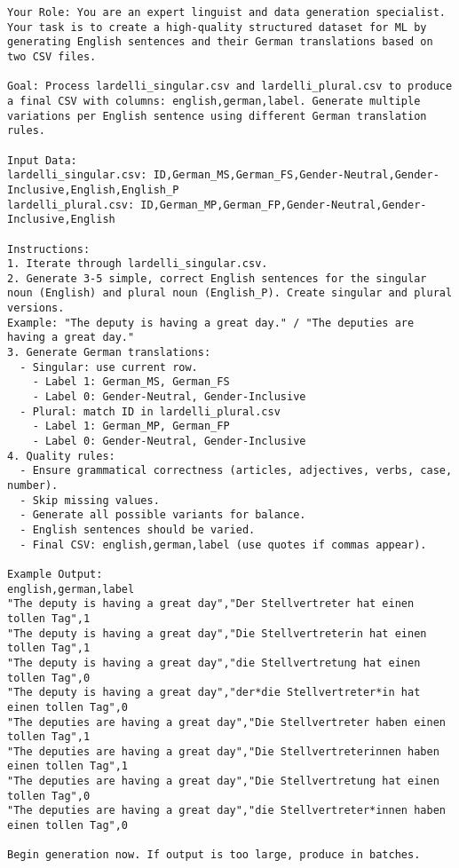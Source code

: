 \begin{lstlisting}
Your Role: You are an expert linguist and data generation specialist. Your task is to create a high-quality structured dataset for ML by generating English sentences and their German translations based on two CSV files.

Goal: Process lardelli_singular.csv and lardelli_plural.csv to produce a final CSV with columns: english,german,label. Generate multiple variations per English sentence using different German translation rules.

Input Data:
lardelli_singular.csv: ID,German_MS,German_FS,Gender-Neutral,Gender-Inclusive,English,English_P
lardelli_plural.csv: ID,German_MP,German_FP,Gender-Neutral,Gender-Inclusive,English

Instructions:
1. Iterate through lardelli_singular.csv.
2. Generate 3-5 simple, correct English sentences for the singular noun (English) and plural noun (English_P). Create singular and plural versions.
Example: "The deputy is having a great day." / "The deputies are having a great day."
3. Generate German translations:
  - Singular: use current row.
    - Label 1: German_MS, German_FS
    - Label 0: Gender-Neutral, Gender-Inclusive
  - Plural: match ID in lardelli_plural.csv
    - Label 1: German_MP, German_FP
    - Label 0: Gender-Neutral, Gender-Inclusive
4. Quality rules:
  - Ensure grammatical correctness (articles, adjectives, verbs, case, number).
  - Skip missing values.
  - Generate all possible variants for balance.
  - English sentences should be varied.
  - Final CSV: english,german,label (use quotes if commas appear).

Example Output:
english,german,label
"The deputy is having a great day","Der Stellvertreter hat einen tollen Tag",1
"The deputy is having a great day","Die Stellvertreterin hat einen tollen Tag",1
"The deputy is having a great day","die Stellvertretung hat einen tollen Tag",0
"The deputy is having a great day","der*die Stellvertreter*in hat einen tollen Tag",0
"The deputies are having a great day","Die Stellvertreter haben einen tollen Tag",1
"The deputies are having a great day","Die Stellvertreterinnen haben einen tollen Tag",1
"The deputies are having a great day","Die Stellvertretung hat einen tollen Tag",0
"The deputies are having a great day","die Stellvertreter*innen haben einen tollen Tag",0

Begin generation now. If output is too large, produce in batches.

\end{lstlisting}

